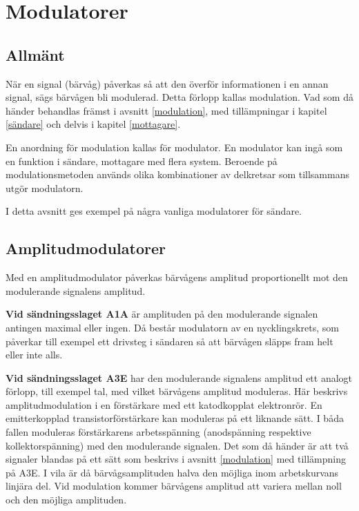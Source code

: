 \section{Modulatorer}

\subsection{Allmänt}

När en signal (bärvåg) påverkas så att den överför informationen i
en annan signal, sägs bärvågen bli modulerad.
Detta förlopp kallas modulation.
Vad som då händer behandlas främst i avsnitt \ref{modulation}, med
tillämpningar i kapitel \ref{sändare} och delvis i kapitel \ref{mottagare}.

En anordning för modulation kallas för modulator.
En modulator kan ingå som en funktion i sändare, mottagare med flera system.
Beroende på modulationsmetoden används olika kombinationer av delkretsar som
tillsammans utgör modulatorn.

I detta avsnitt ges exempel på några vanliga modulatorer för sändare.

\subsection{Amplitudmodulatorer}

Med en amplitudmodulator påverkas bärvågens amplitud proportionellt
mot den modulerande signalens amplitud.

\textbf{Vid sändningsslaget A1A} är amplituden på den modulerande signalen
antingen maximal eller ingen.
Då består modulatorn av en nycklingskrets, som påverkar till exempel ett
drivsteg i sändaren så att bärvågen släpps fram helt eller inte alls.

\textbf{Vid sändningsslaget A3E} har den modulerande signalens amplitud
ett analogt förlopp, till exempel tal, med vilket bärvågens amplitud moduleras.
Här beskrivs amplitudmodulation i en förstärkare med ett katodkopplat
elektronrör.
En emitterkopplad transistorförstärkare kan moduleras på ett liknande sätt.
I båda fallen moduleras förstärkarens arbetsspänning (anodspänning respektive 
kollektorspänning) med den modulerande signalen.
Det som då händer är att två signaler blandas på ett sätt som beskrivs i
avsnitt \ref{modulation} med tillämpning på A3E.
I vila är då bärvågsamplituden halva den möjliga inom arbetskurvans linjära del.
Vid modulation kommer bärvågens amplitud att variera mellan noll
och den möjliga amplituden.

